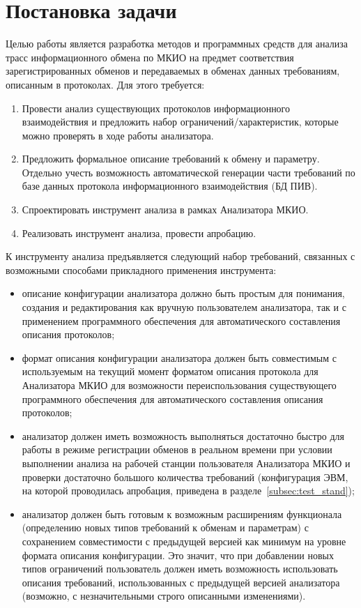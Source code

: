 \section{Постановка задачи}

Целью работы является разработка методов и программных средств для анализа 
трасс информационного обмена по МКИО на предмет соответствия зарегистрированных 
обменов и передаваемых в обменах данных требованиям, описанным в протоколах. 
Для этого требуется:

\begin{enumerate}
 \item Провести анализ существующих протоколов информационного 
взаимодействия и предложить набор ограничений/характеристик, которые можно 
проверять в ходе работы анализатора.
 \item Предложить формальное описание требований к обмену и параметру. Отдельно 
учесть возможность автоматической генерации части требований по базе данных 
протокола информационного взаимодействия (БД ПИВ).
 \item Спроектировать инструмент анализа в рамках Анализатора МКИО.
 \item Реализовать инструмент анализа, провести апробацию.
\end{enumerate}

К инструменту анализа предъявляется следующий набор требований, связанных с 
возможными способами прикладного применения инструмента:

\begin{itemize}
 \item описание конфигурации анализатора должно быть простым для 
понимания, создания и редактирования как вручную пользователем анализатора, так 
и с применением программного обеспечения для автоматического составления 
описания протоколов;
 \item формат описания конфигурации анализатора должен быть совместимым с 
используемым на текущий момент форматом описания протокола для Анализатора 
МКИО для возможности переиспользования существующего программного обеспечения 
для автоматического составления описания протоколов;
 \item анализатор должен иметь возможность выполняться 
достаточно быстро для работы в режиме регистрации обменов в реальном времени 
при условии выполнении анализа на рабочей станции пользователя Анализатора МКИО 
и проверки достаточно большого количества требований (конфигурация ЭВМ, на 
которой проводилась апробация, приведена в разделе~\ref{subsec:test_stand});
 \item анализатор должен быть готовым к возможным расширениям 
 функционала (определению новых типов требований к обменам и параметрам) с 
сохранением совместимости с предыдущей версией как минимум на уровне формата 
описания конфигурации. Это значит, что при добавлении новых типов ограничений 
пользователь должен иметь возможность использовать описания требований, 
использованных с предыдущей версией анализатора (возможно, с незначительными 
строго описанными изменениями).
\end{itemize}

